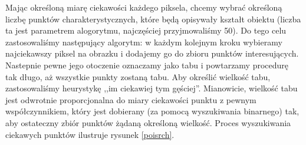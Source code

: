 \documentclass[a4paper,12pt,leqno]{article}
\begin{document}
Mając określoną miarę ciekawości każdego piksela, chcemy wybrać określoną liczbę punktów charakterystycznych, które będą opisywały kształt obiektu
(liczba ta jest parametrem alogorytmu, najczęściej przyjmowaliśmy 50). Do tego celu zastosowaliśmy następujący algorytm: w każdym kolejnym kroku wybieramy
najciekawszy piksel na obrazku i dodajemy go do zbioru punktów interesujących. Nastepnie pewne jego otoczenie oznaczamy jako tabu i powtarzamy procedurę tak
długo, aż wszystkie punkty zostaną tabu. Aby określić wielkość tabu, zastosowaliśmy heurystykę ,,im ciekawiej tym gęściej''. Mianowicie, wielkość tabu jest
odwrotnie proporcjonalna do miary ciekawości punktu z pewnym współczynnikiem, który jest dobierany (za pomocą wyszukiwania binarnego) tak, aby ostateczny
zbiór punktów żądaną określoną wielkość. Proces wyszukiwania ciekawych punktów ilustruje rysunek \ref{poisrch}.
\end{document}
